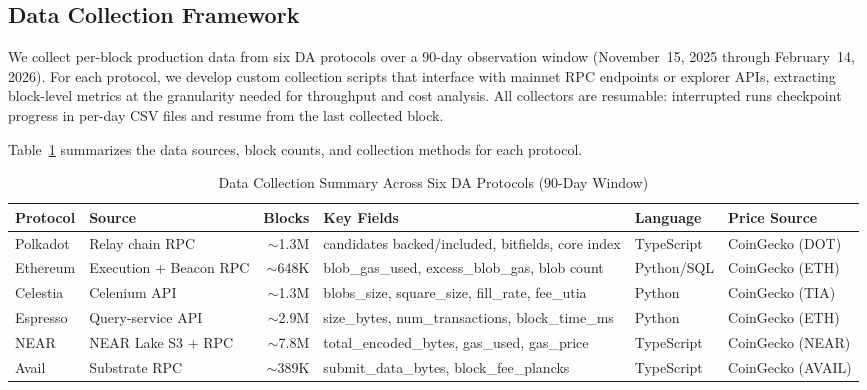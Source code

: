 
\subsection{Data Collection Framework}
\label{sec:meth-collection}

We collect per-block production data from six DA protocols over a 90-day observation window (November~15, 2025 through February~14, 2026).
For each protocol, we develop custom collection scripts that interface with mainnet RPC endpoints or explorer APIs, extracting block-level metrics at the granularity needed for throughput and cost analysis.
All collectors are resumable: interrupted runs checkpoint progress in per-day CSV files and resume from the last collected block.

Table~\ref{tab:collection_summary} summarizes the data sources, block counts, and collection methods for each protocol.

\begin{table}[t]
\centering
\caption{Data Collection Summary Across Six DA Protocols (90-Day Window)}
\label{tab:collection_summary}
\setlength{\tabcolsep}{3pt}
\footnotesize
\begin{tabular}{llrlll}
\toprule
\textbf{Protocol} & \textbf{Source} & \textbf{Blocks} & \textbf{Key Fields} & \textbf{Language} & \textbf{Price Source} \\
\midrule
Polkadot & Relay chain RPC & $\sim$1.3M & candidates backed/included, bitfields, core index & TypeScript & CoinGecko (DOT) \\
Ethereum & Execution + Beacon RPC & $\sim$648K & blob\_gas\_used, excess\_blob\_gas, blob count & Python/SQL & CoinGecko (ETH) \\
Celestia & Celenium API & $\sim$1.3M & blobs\_size, square\_size, fill\_rate, fee\_utia & Python & CoinGecko (TIA) \\
Espresso & Query-service API & $\sim$2.9M & size\_bytes, num\_transactions, block\_time\_ms & Python & CoinGecko (ETH) \\
NEAR & NEAR Lake S3 + RPC & $\sim$7.8M & total\_encoded\_bytes, gas\_used, gas\_price & TypeScript & CoinGecko (NEAR) \\
Avail & Substrate RPC & $\sim$389K & submit\_data\_bytes, block\_fee\_plancks & TypeScript & CoinGecko (AVAIL) \\
\bottomrule
\end{tabular}
\end{table}

